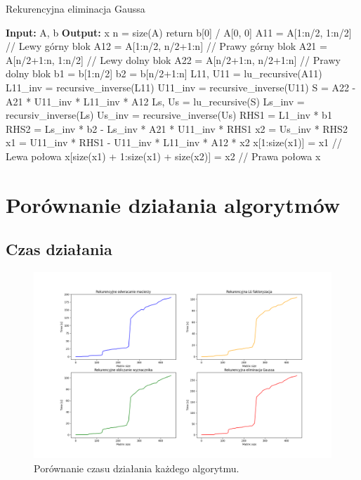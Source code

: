 \documentclass[11pt, leqno]{scrartcl}
\begin{document}
    \begin{algorithm}[H]
        \caption{Rekurencyjna eliminacja Gaussa}
        \begin{algorithmic}
            \State \textbf{Input:} A, b
            \State \textbf{Output:} x
                \State n = size(A)
                    \State return b[0] / A[0, 0]
                \EndIf
                \State
                \State A11 = A[1:n/2, 1:n/2]      // Lewy górny blok
                \State A12 = A[1:n/2, n/2+1:n]    // Prawy górny blok
                \State A21 = A[n/2+1:n, 1:n/2]    // Lewy dolny blok
                \State A22 = A[n/2+1:n, n/2+1:n]  // Prawy dolny blok
                \State b1 = b[1:n/2]
                \State b2 = b[n/2+1:n]
                \State
                \State L11, U11 = lu\_recursive(A11)
                \State L11\_inv = recursive\_inverse(L11)
                \State U11\_inv = recursive\_inverse(U11)
                \State S = A22 - A21 * U11\_inv * L11\_inv * A12
                \State Ls, Us = lu\_recursive(S)
                \State Ls\_inv = recursiv\_inverse(Ls)
                \State Us\_inv = recursive\_inverse(Us)
                \State
                \State RHS1 = L1\_inv * b1
                \State RHS2 = Ls\_inv * b2 -
                    Ls\_inv * A21 * U11\_inv * RHS1
                \State x2 = Us\_inv * RHS2
                \State x1 = U11\_inv * RHS1 -
                    U11\_inv * L11\_inv * A12 * x2
                    \State
                \State x[1:size(x1)] = x1     // Lewa połowa
                \State x[size(x1) + 1:size(x1) + size(x2)] = x2
                                              // Prawa połowa
                \State \Return x
            \EndFunction
        \end{algorithmic}
    \end{algorithm}

    \section{Porównanie działania algorytmów}
    \subsection{Czas działania}
    \begin{figure}[H]
        \centering
        \includegraphics[width=0.8\linewidth]{zad2_time2.png}
        \caption{Porównanie czasu działania każdego algorytmu.}
    \end{figure}
\end{document}
